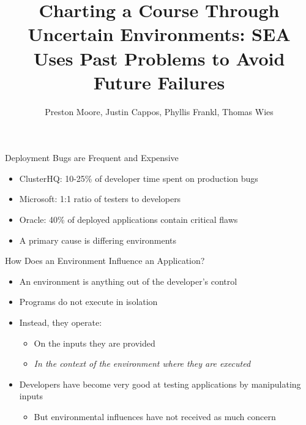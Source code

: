 \documentclass[pdf]{beamer}
\title{Charting a Course Through Uncertain Environments: SEA Uses Past
Problems to Avoid Future Failures}
\author{Preston Moore, Justin Cappos, Phyllis Frankl, Thomas Wies}
\begin{document}
\begin{frame}
  \titlepage{}
\end{frame}



\begin{frame}{Deployment Bugs are Frequent and Expensive}
  \begin{itemize}
    \item{ClusterHQ: 10-25\% of developer time spent on production bugs}
    \item{Microsoft: 1:1 ratio of testers to developers}
    \item{Oracle: 40\% of deployed applications contain critical flaws}
    \item{A primary cause is differing environments}
  \end{itemize}

\end{frame}


\begin{frame}{How Does an Environment Influence an Application?}
  \begin{itemize}
    \item{An environment is anything out of the developer's control}
    \item{Programs do not execute in isolation}
    \item{Instead, they operate:}
      \begin{itemize}
        \item{On the inputs they are provided}
        \item{\textit{In the context of the environment where they are executed}}
      \end{itemize}
    \item{Developers have become very good at testing applications by
      manipulating inputs}
      \begin{itemize}
        \item{But environmental influences have not received as much
            concern}
      \end{itemize}
  \end{itemize}
\end{frame}
\end{document}
